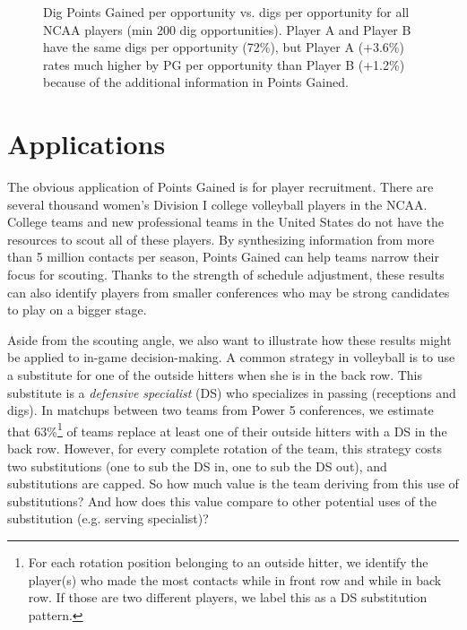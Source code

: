 \documentclass[USenglish]{article}
\theoremstyle{dgthm}
\theoremstyle{dgdef}
\begin{document}
\begin{figure}
    \centering
    \caption{Dig Points Gained per opportunity vs. digs per opportunity for all NCAA players (min 200 dig opportunities). Player A and Player B have the same digs per opportunity (72\%), but Player A (+3.6\%) rates much higher by PG per opportunity than Player B (+1.2\%) because of the additional information in Points Gained.}
    \label{fig:dig-comparison}
\end{figure}


\section{Applications}
\label{sec:applications}

The obvious application of Points Gained is for player recruitment. There are several thousand women's Division I college volleyball players in the NCAA. College teams and new professional teams in the United States do not have the resources to scout all of these players. By synthesizing information from more than 5 million contacts per season, Points Gained can help teams narrow their focus for scouting. Thanks to the strength of schedule adjustment, these results can also identify players from smaller conferences who may be strong candidates to play on a bigger stage.

Aside from the scouting angle, we also want to illustrate how these results might be applied to in-game decision-making. A common strategy in volleyball is to use a substitute for one of the outside hitters when she is in the back row. This substitute is a {\it defensive specialist} (DS) who specializes in passing (receptions and digs). In matchups between two teams from Power 5 conferences, we estimate that 63\%\footnote{For each rotation position belonging to an outside hitter, we identify the player(s) who made the most contacts while in front row and while in back row. If those are two different players, we label this as a DS substitution pattern.} of teams replace at least one of their outside hitters with a DS in the back row. However, for every complete rotation of the team, this strategy costs two substitutions (one to sub the DS in, one to sub the DS out), and substitutions are capped. So how much value is the team deriving from this use of substitutions? And how does this value compare to other potential uses of the substitution (e.g. serving specialist)?
\end{document}
